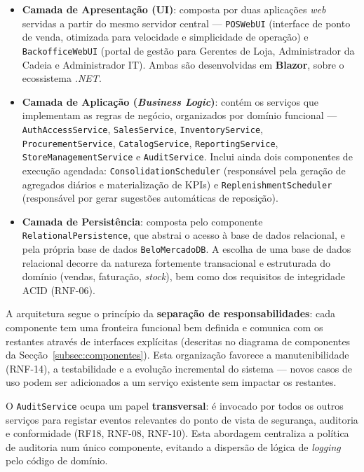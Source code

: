 \begin{itemize}
    \item \textbf{Camada de Apresentação (UI)}: composta por duas aplicações \textit{web} servidas a partir do mesmo servidor central --- \texttt{POSWebUI} (interface de ponto de venda, otimizada para velocidade e simplicidade de operação) e \texttt{BackofficeWebUI} (portal de gestão para Gerentes de Loja, Administrador da Cadeia e Administrador IT). Ambas são desenvolvidas em \textbf{Blazor}, sobre o ecossistema \textit{.NET}.

    \item \textbf{Camada de Aplicação (\textit{Business Logic})}: contém os serviços que implementam as regras de negócio, organizados por domínio funcional --- \texttt{AuthAccessService}, \texttt{SalesService}, \texttt{InventoryService}, \texttt{ProcurementService}, \texttt{CatalogService}, \texttt{ReportingService}, \texttt{StoreManagementService} e \texttt{AuditService}. Inclui ainda dois componentes de execução agendada: \texttt{ConsolidationScheduler} (responsável pela geração de agregados diários e materialização de KPIs) e \texttt{ReplenishmentScheduler} (responsável por gerar sugestões automáticas de reposição).

    \item \textbf{Camada de Persistência}: composta pelo componente \texttt{RelationalPersistence}, que abstrai o acesso à base de dados relacional, e pela própria base de dados \texttt{BeloMercadoDB}. A escolha de uma base de dados relacional decorre da natureza fortemente transacional e estruturada do domínio (vendas, faturação, \textit{stock}), bem como dos requisitos de integridade ACID (RNF-06).
\end{itemize}

    A arquitetura segue o princípio da \textbf{separação de responsabilidades}: cada componente tem uma fronteira funcional bem definida e comunica com os restantes através de interfaces explícitas (descritas no diagrama de componentes da Secção~\ref{subsec:componentes}). Esta organização favorece a manutenibilidade (RNF-14), a testabilidade e a evolução incremental do sistema --- novos casos de uso podem ser adicionados a um serviço existente sem impactar os restantes.

    O \texttt{AuditService} ocupa um papel \textbf{transversal}: é invocado por todos os outros serviços para registar eventos relevantes do ponto de vista de segurança, auditoria e conformidade (RF18, RNF-08, RNF-10). Esta abordagem centraliza a política de auditoria num único componente, evitando a dispersão de lógica de \textit{logging} pelo código de domínio.

